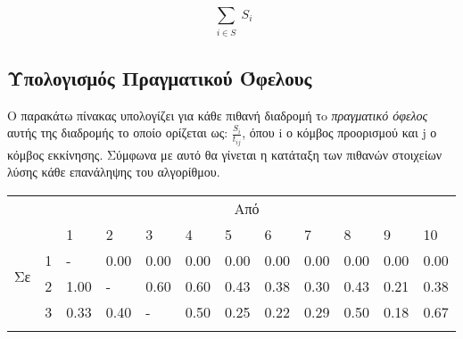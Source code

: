 \documentclass[12pt, a4paper]{article}
\begin{document}
\begin{equation}
 \sum_{\substack{
		 i \in S}}
	S_i
\end{equation}

\subsection{Υπολογισμός Πραγματικού Όφελους}

Ο παρακάτω πίνακας υπολογίζει για κάθε πιθανή διαδρομή τo \textit{πραγματικό όφελος} αυτής της διαδρομής το οποίο ορίζεται ως: \(\frac{S_i}{t_{ij}}\), όπου i ο κόμβος προορισμού και j ο κόμβος εκκίνησης. Σύμφωνα με αυτό θα γίνεται η κατάταξη των πιθανών στοιχείων λύσης κάθε επανάληψης του αλγορίθμου.

\begin{table}[H]
\centering
\label{my-label}
\begin{tabular}{llllllllllll}
\multicolumn{1}{l}{} & \multicolumn{11}{c}{Από}                                                                                                                                                                                                                                                                                                                                                   \\
\multirow{11}{*}{Σε} &                         & 1                         & 2                         & 3                         & 4                         & 5                         & 6                         & 7                         & 8                         & 9                         & 10                        \\ \cline{3-12} 
                     & \multicolumn{1}{l|}{1}  & \multicolumn{1}{l|}{-}    & \multicolumn{1}{l|}{0.00} & \multicolumn{1}{l|}{0.00} & \multicolumn{1}{l|}{0.00} & \multicolumn{1}{l|}{0.00} & \multicolumn{1}{l|}{0.00} & \multicolumn{1}{l|}{0.00} & \multicolumn{1}{l|}{0.00} & \multicolumn{1}{l|}{0.00} & \multicolumn{1}{l|}{0.00} \\ \cline{3-12} 
                     & \multicolumn{1}{l|}{2}  & \multicolumn{1}{l|}{1.00} & \multicolumn{1}{l|}{-}    & \multicolumn{1}{l|}{0.60} & \multicolumn{1}{l|}{0.60} & \multicolumn{1}{l|}{0.43} & \multicolumn{1}{l|}{0.38} & \multicolumn{1}{l|}{0.30} & \multicolumn{1}{l|}{0.43} & \multicolumn{1}{l|}{0.21} & \multicolumn{1}{l|}{0.38} \\ \cline{3-12} 
                     & \multicolumn{1}{l|}{3}  & \multicolumn{1}{l|}{0.33} & \multicolumn{1}{l|}{0.40} & \multicolumn{1}{l|}{-}    & \multicolumn{1}{l|}{0.50} & \multicolumn{1}{l|}{0.25} & \multicolumn{1}{l|}{0.22} & \multicolumn{1}{l|}{0.29} & \multicolumn{1}{l|}{0.50} & \multicolumn{1}{l|}{0.18} & \multicolumn{1}{l|}{0.67} \\ \cline{3-12} 

\end{tabular}
\end{table}
\end{document}
